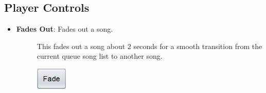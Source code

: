 \documentclass{article}
\begin{document}
\subsection{Player Controls}

\begin{itemize}
    \item \textbf{Fades Out}: Fades out a song.
    \begin{description}
        \item[] This fades out a song about 2 seconds for a smooth transition from the current queue song list to another song.
        \item[] \includegraphics[width=1.5cm]{Images/Fade.png}
    \end{description}
    
    \clearpage
    

\end{itemize}
\end{document}
